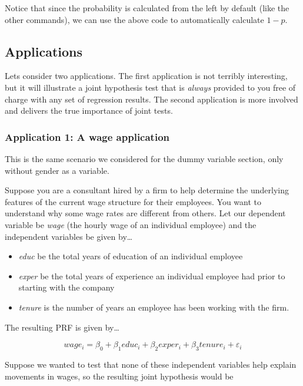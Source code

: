 \documentclass[
]{book}
\begin{document}
Notice that since the probability is calculated from the left by default (like the other commands), we can use the above code to automatically calculate \(1-p\).

\hypertarget{applications}{%
\subsection{Applications}\label{applications}}

Lets consider two applications. The first application is not terribly interesting, but it will illustrate a joint hypothesis test that is \emph{always} provided to you free of charge with any set of regression results. The second application is more involved and delivers the true importance of joint tests.

\hypertarget{application-1-a-wage-application}{%
\subsubsection*{Application 1: A wage application}\label{application-1-a-wage-application}}

This is the same scenario we considered for the dummy variable section, only without gender as a variable.

Suppose you are a consultant hired by a firm to help determine the underlying features of the current wage structure for their employees. You want to understand why some wage rates are different from others. Let our dependent variable be \emph{wage} (the hourly wage of an individual employee) and the independent variables be given by\ldots{}

\begin{itemize}
\item
  \emph{educ} be the total years of education of an individual employee
\item
  \emph{exper} be the total years of experience an individual employee had prior to starting with the company
\item
  \emph{tenure} is the number of years an employee has been working with the firm.
\end{itemize}

The resulting PRF is given by\ldots{}

\[wage_i=\beta_0+\beta_1educ_i+\beta_2exper_i+\beta_3tenure_i+\varepsilon_i\]

Suppose we wanted to test that none of these independent variables help explain movements in wages, so the resulting joint hypothesis would be
\end{document}
